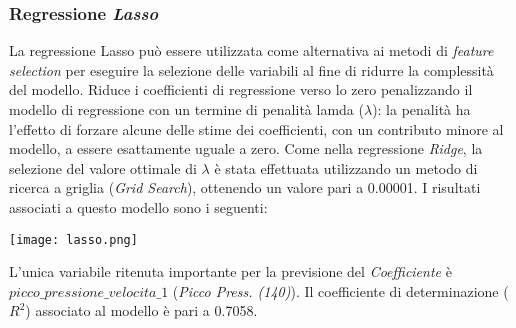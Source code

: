 \documentclass[fleqn,10pt]{SelfArx} %
\begin{document}
\subsubsection{Regressione \textit{Lasso}}
La regressione Lasso può essere utilizzata come alternativa ai metodi di \textit{feature selection} per eseguire la selezione delle variabili al fine di ridurre la complessità del modello. Riduce i coefficienti di regressione verso lo zero penalizzando il modello di regressione con un termine di penalità lamda ($\lambda$): la penalità ha l’effetto di forzare alcune delle stime dei coefficienti, con un contributo minore al modello, a essere esattamente uguale a zero.
Come nella regressione \textit{Ridge}, la selezione del valore ottimale di $\lambda$ è stata effettuata utilizzando un metodo di ricerca a griglia (\textit{Grid Search}), ottenendo un valore pari a 0.00001. I risultati associati a questo modello sono i seguenti:
\begin{center}
\texttt{[image: lasso.png]}
\end{center}
L'unica variabile ritenuta importante per la previsione del \textit{Coefficiente} è $picco\_pressione\_velocita\_1$ (\textit{Picco Press. (140)}). Il coefficiente di determinazione ($R^2$) associato al modello è pari a 0.7058.



\end{document}
